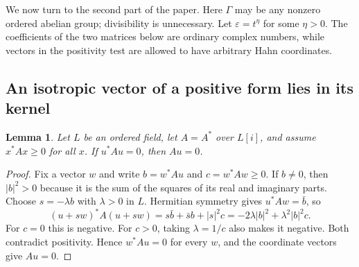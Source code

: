 \documentclass[11pt,oneside]{article}
\newtheorem{lemma}[theorem]{Lemma}
\theoremstyle{definition}
\theoremstyle{remark}
\newcommand{\eps}{\varepsilon}
\begin{document}
We now turn to the second part of the paper. Here $\Gamma$ may be any
nonzero ordered abelian group; divisibility is unnecessary. Let
$\eps=t^\eta$ for some $\eta>0$.
The coefficients of the two matrices below are ordinary complex
numbers, while vectors in the positivity test are allowed to have
arbitrary Hahn coordinates.

\subsection{An isotropic vector of a positive form lies in its kernel}

\begin{lemma}\label{hnd:lem:psdkernel}
Let $L$ be an ordered field, let $A=A^*$ over $L[i]$, and assume
$x^*Ax\ge0$ for all $x$. If $u^*Au=0$, then $Au=0$.
\end{lemma}
\begin{proof}
Fix a vector $w$ and write $b=w^*Au$ and $c=w^*Aw\ge0$.
If $b\ne0$, then $|b|^2>0$ because it is the sum of the squares of
its real and imaginary parts. Choose $s=-\lambda b$ with $\lambda>0$
in $L$. Hermitian symmetry gives $u^*Aw=\bar b$, so
\[
 (u+sw)^*A(u+sw)
 =s\bar b+\bar s b+|s|^2c
 =-2\lambda|b|^2+\lambda^2|b|^2c.
\]
For $c=0$ this is negative. For $c>0$, taking $\lambda=1/c$
also makes it negative. Both contradict positivity. Hence
$w^*Au=0$ for every $w$, and the coordinate vectors give $Au=0$.
\end{proof}
\end{document}
